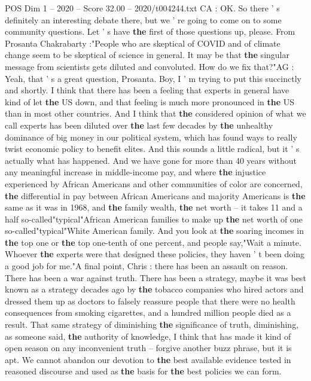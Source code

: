 \begin{textsample}{POS Dim 1 – 2020 – Score 32.00 – 2020/t004244.txt}
CA : OK.
So there ' s definitely an interesting debate there, but we ' re going to come on to some community questions.
Let ' s have \textbf{the} first of those questions up, please.
From Prosanta Chakrabarty :"People who are skeptical of COVID and of climate change seem to be skeptical of science in general.
It may be that \textbf{the} singular message from scientists gets diluted and convoluted.
How do we fix that?"AG : Yeah, that ' s a great question, Prosanta.
Boy, I ' m trying to put this succinctly and shortly.
I think that there has been a feeling that experts in general have kind of let \textbf{the} US down, and that feeling is much more pronounced in \textbf{the} US than in most other countries.
And I think that \textbf{the} considered opinion of what we call experts has been diluted over \textbf{the} last few decades by \textbf{the} unhealthy dominance of big money in our political system, which has found ways to really twist economic policy to benefit elites.
And this sounds a little radical, but it ' s actually what has happened.
And we have gone for more than 40 years without any meaningful increase in middle-income pay, and where \textbf{the} injustice experienced by African Americans and other communities of color are concerned, \textbf{the} differential in pay between African Americans and majority Americans is \textbf{the} same as it was in 1968, and \textbf{the} family wealth, \textbf{the} net worth -- it takes 11 and a half so-called"typical"African American families to make up \textbf{the} net worth of one so-called"typical"White American family.
And you look at \textbf{the} soaring incomes in \textbf{the} top one or \textbf{the} top one-tenth of one percent, and people say,"Wait a minute.
Whoever \textbf{the} experts were that designed these policies, they haven ' t been doing a good job for me."A final point, Chris : there has been an assault on reason.
There has been a war against truth.
There has been a strategy, maybe it was best known as a strategy decades ago by \textbf{the} tobacco companies who hired actors and dressed them up as doctors to falsely reassure people that there were no health consequences from smoking cigarettes, and a hundred million people died as a result.
That same strategy of diminishing \textbf{the} significance of truth, diminishing, as someone said, \textbf{the} authority of knowledge, I think that has made it kind of open season on any inconvenient truth -- forgive another buzz phrase, but it is apt.
We cannot abandon our devotion to \textbf{the} best available evidence tested in reasoned discourse and used as \textbf{the} basis for \textbf{the} best policies we can form.

\end{textsample}

